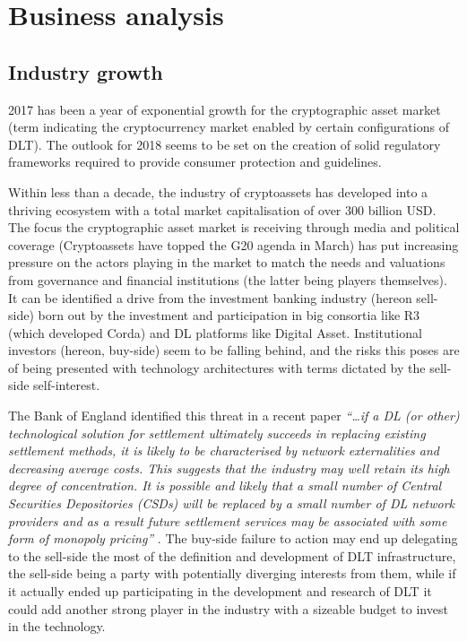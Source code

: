\chapter{Business analysis}
\label{chap:business-analysis}

\section{Industry growth}

2017 has been a year of exponential growth for the cryptographic asset market (term indicating the cryptocurrency market enabled by certain configurations of DLT). The outlook for 2018 seems to be set on the creation of solid regulatory frameworks required to provide consumer protection and guidelines.

Within less than a decade, the industry of cryptoassets has developed into a thriving ecosystem with a total market capitalisation of over 300 billion USD.
The focus the cryptographic asset market is receiving through media and political coverage (Cryptoassets have topped the G20 agenda in March) has put increasing pressure on the actors playing in the market to match the needs and valuations from governance and financial institutions (the latter being players themselves).\\

It can be identified a drive from the investment banking industry (hereon sell-side) born out by the investment and participation in big consortia like R3 (which developed Corda) and DL platforms like Digital Asset. Institutional investors (hereon, buy-side) seem to be falling behind, and the risks this poses are of being presented with technology architectures with terms dictated by the sell-side self-interest.

The Bank of England identified this threat in a recent paper \textit{“…if a DL (or other) technological solution for settlement ultimately succeeds in replacing existing settlement methods,
it is likely to be characterised by network externalities and decreasing average costs. This suggests that the industry may well retain its high degree of concentration. It is possible and likely that a small number of Central Securities Depositories (CSDs) will be replaced by a small number of DL network providers and as a result future settlement services may be associated with some form of monopoly pricing”} \cite{bankofenglandreport}. The buy-side failure to action may end up delegating to the sell-side the most of the definition and development of DLT infrastructure, the sell-side being a party with potentially diverging interests from them, while if it actually ended up participating in the development and research of DLT it could add another strong player in the industry with a sizeable budget to invest in the technology.

